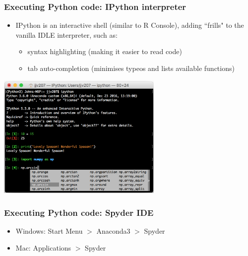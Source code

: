 \documentclass[xcolor=table]{beamer}
\begin{document}


\begin{frame}[fragile]
\frametitle{Executing Python code: IPython interpreter}
\begin{itemize}
	\item IPython is an interactive shell (similar to R Console), adding ``frills" to the vanilla IDLE interpreter, such as:

	\begin{itemize}
		\item syntax highlighting (making it easier to read code)
		\item tab auto-completion (minimises typeos and lists available functions)  
	\end{itemize}
\end{itemize}

\begin{center}
\includegraphics[width=0.6\textwidth]{ipython.png}
\end{center}
\end{frame}

\begin{frame}[fragile]
\frametitle{Executing Python code: Spyder IDE}
    \begin{itemize}
        \item Windows: Start Menu $>$ Anaconda3 $>$ Spyder
            \pause
        \item Mac: Applications $>$ Spyder
    \end{itemize}
\end{frame}
\end{document}
